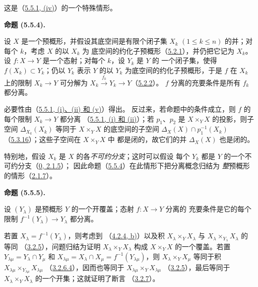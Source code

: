 \documentclass[UTF8,fontset=none,11pt,oneside,openany]{ctexbook}
\newenvironment{proposition}[1][]{%
  \par\medskip\noindent\textbf{命题 (#1).}\ %
}{\par}
\newcommand{\oldpage}[2][]{%
  \hypertarget{ega-source-page-#1-#2}{}%
  \marginnote{\scriptsize\textbf{#1}~|~#2}\ignorespaces}
\let\EGAOriginalLabel\label
\renewcommand{\label}[1]{\phantomsection\EGAOriginalLabel{#1}}
\begin{document}
这是（\hyperref[I.5.5.1-fr]{5.5.1, (iv)}）的一个特殊情形。

\begin{proposition}[5.5.4]
\label{I.5.5.4-fr}
设 $X$ 是一个预概形，并假设其底空间是有限个闭子集 $X_k$
$(1\leq k\leq n)$ 的并；对每个 $k$，考虑 $X$ 的以 $X_k$ 为
底空间的约化子预概形（\hyperref[I.5.2.1-fr]{5.2.1}），并仍把它记为
$X_k$。设 $f:X\to Y$ 是一个态射；对每个 $k$，设 $Y_k$ 是 $Y$ 的
一个闭子集，使得 $f(X_k)\subset Y_k$；仍以 $Y_k$ 表示 $Y$ 的以
$Y_k$ 为底空间的约化子预概形，于是 $f$ 在 $X_k$ 上的限制
$X_k\to Y$ 可分解为
$X_k\xrightarrow{f_k}Y_k\to Y$（\hyperref[I.5.2.2-fr]{5.2.2}）。
$f$ 分离的充要条件是所有 $f_k$ 都分离。
\end{proposition}

必要性由（\hyperref[I.5.5.1-fr]{5.5.1, (i)、(ii) 和 (v)}）得出。
反过来，若命题中的条件成立，则 $f$ 的每个限制 $X_k\to Y$ 都分离
（\hyperref[I.5.5.1-fr]{5.5.1, (i) 和 (ii)}）；若 $p_1$、$p_2$ 是
$X\times_Y X$ 的投影，则子空间 $\Delta_{X_k}(X_k)$ 等同于
$X\times_Y X$ 的底空间的子空间
$\Delta_X(X)\cap p_1^{-1}(X_k)$
（\hyperref[I.5.3.16-fr]{5.3.16}）；这些子空间在 $X\times_Y X$ 中
都是闭的，故它们的并 $\Delta_X(X)$ 也是闭的。

特别地，假设 $X_k$ 是 $X$ 的各\emph{不可约分支}；这时可以假设
每个 $Y_k$ 都是 $Y$ 的一个不可约分支（\hyperref[0.2.1.5-fr]{0, 2.1.5}）；
因此命题（\hyperref[I.5.5.4-fr]{5.5.4}）在此情形下把分离概念归结为
\emph{整}预概形的情形（\hyperref[I.2.1.7-fr]{2.1.7}）。

\oldpage[I]{138}

\begin{proposition}[5.5.5]
\label{I.5.5.5-fr}
设 $(Y_\lambda)$ 是预概形 $Y$ 的一个开覆盖；态射 $f:X\to Y$ 分离的
充要条件是它的每个限制 $f^{-1}(Y_\lambda)\to Y_\lambda$ 都分离。
\end{proposition}

若置 $X_\lambda=f^{-1}(Y_\lambda)$，则考虑到
（\hyperref[I.4.2.4-fr]{4.2.4, b)}）以及积
$X_\lambda\times_Y X_\lambda$ 与
$X_\lambda\times_{Y_\lambda}X_\lambda$ 的等同
（\hyperref[I.3.2.5-fr]{3.2.5}），问题归结为证明
$X_\lambda\times_Y X_\lambda$ 构成 $X\times_Y X$ 的一个覆盖。若置
$Y_{\lambda\mu}=Y_\lambda\cap Y_\mu$ 和
$X_{\lambda\mu}=X_\lambda\cap X_\mu=f^{-1}(Y_{\lambda\mu})$，则
$X_\lambda\times_Y X_\mu$ 等同于积
$X_{\lambda\mu}\times_{Y_{\lambda\mu}}X_{\lambda\mu}$
（\hyperref[I.3.2.6.4-fr]{3.2.6.4}），因而也等同于
$X_{\lambda\mu}\times_Y X_{\lambda\mu}$
（\hyperref[I.3.2.5-fr]{3.2.5}），最后等同于
$X_\lambda\times_Y X_\lambda$ 的一个开集；这就证明了断言
（\hyperref[I.3.2.7-fr]{3.2.7}）。
\end{document}
